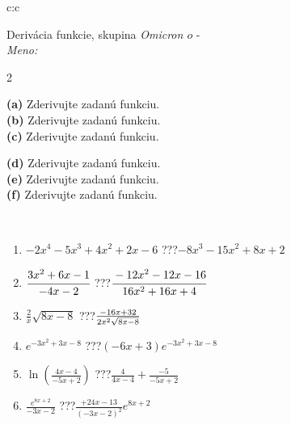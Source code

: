 \documentclass[10pt]{report}
\newcommand\omicron{o}
\begin{document}
\begin{tabular}{c:c}
\begin{minipage}[c][104.5mm][t]{0.5\linewidth}
\begin{center}
\vspace{7mm}
{\huge Derivácia funkcie, skupina \textit{Omicron $\omicron$} -}\\[5mm]
\textit{Meno:}\phantom{xxxxxxxxxxxxxxxxxxxxxxxxxxxxxxxxxxxxxxxxxxxxxxxxxxxxxxxxxxxxxxxxx}\\[5mm]
\begin{minipage}{0.95\linewidth}
\begin{center}
{\small \begin{multicols}{2} \raggedright
\textbf{(a)} Zderivujte zadanú funkciu. \\[1mm]
\textbf{(b)} Zderivujte zadanú funkciu. \\[1mm]
\textbf{(c)} Zderivujte zadanú funkciu. \par \columnbreak
\textbf{(d)} Zderivujte zadanú funkciu. \\[1mm]
\textbf{(e)} Zderivujte zadanú funkciu. \\[1mm]
\textbf{(f)} Zderivujte zadanú funkciu.
\end{multicols}
}
\end{center}
\end{minipage}
\\[4mm]
\begin{minipage}{0.79\linewidth}
\begin{center}
\begin{varwidth}{\linewidth}
\begin{enumerate}
\normalsize
\item $-2x^4-5x^3+4x^2+2x-6$\quad \dotfill\; ???\;\dotfill \quad $-8x^3-15x^2+8x+2$
\item $\cfrac{3x^2+6x-1}{-4x-2}$\quad \dotfill\; ???\;\dotfill \quad $\cfrac{-12x^2-12x-16}{16x^2+16x+4}$
\item $\frac{2}{x}\sqrt{8x-8}$\quad \dotfill\; ???\;\dotfill \quad $\frac{-16x+32}{2x^2 \sqrt{\smash[b]{8x-8}}}$
\item $e^{-3x^2+3x-8}$\quad \dotfill\; ???\;\dotfill \quad $(-6x+3)e^{-3x^2+3x-8}$
\item $\ln{\left(\frac{4x-4}{-5x+2}\right)}$\quad \dotfill\; ???\;\dotfill \quad $\frac{4}{4x-4}+\frac{-5}{-5x+2}$
\item $\frac{e^{8x+2}}{-3x-2}$\quad \dotfill\; ???\;\dotfill \quad $\frac{+24x-13}{(-3x-2)^2}e^{8x+2}$
\end{enumerate}

\end{varwidth}
\end{center}
\end{minipage}
\end{center}
\end{minipage}
\end{tabular}
\end{document}
